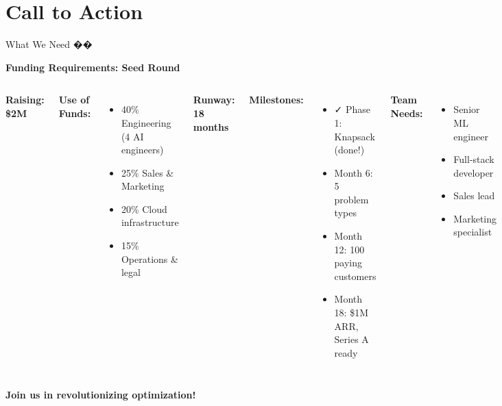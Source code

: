 \documentclass[aspectratio=169]{beamer}
\begin{document}
\section{Call to Action}

\begin{frame}{What We Need ��}
\begin{center}
\textbf{Funding Requirements: Seed Round}
\end{center}

\vspace{0.3cm}

\begin{columns}
\textbf{Raising: \$2M}

\vspace{0.3cm}
\textbf{Use of Funds:}
\begin{itemize}
    \item 40\% Engineering (4 AI engineers)
    \item 25\% Sales \& Marketing
    \item 20\% Cloud infrastructure
    \item 15\% Operations \& legal
\end{itemize}

\vspace{0.3cm}
\textbf{Runway: 18 months}

\textbf{Milestones:}
\begin{itemize}
    \item ✓ Phase 1: Knapsack (done!)
    \item Month 6: 5 problem types
    \item Month 12: 100 paying customers
    \item Month 18: \$1M ARR, Series A ready
\end{itemize}

\vspace{0.3cm}
\textbf{Team Needs:}
\begin{itemize}
    \item Senior ML engineer
    \item Full-stack developer
    \item Sales lead
    \item Marketing specialist
\end{itemize}
\end{columns}

\vspace{0.5cm}
\begin{center}
\textcolor{aiblue}{\large \textbf{Join us in revolutionizing optimization!}}
\end{center}
\end{frame}
\end{document}
